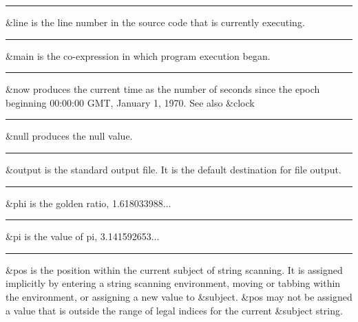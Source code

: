 \bigskip\hrule\vspace{0.1cm}

\noindent
{}\textsf{\&line} is the line number in the
source code that is currently executing.

\bigskip\hrule\vspace{0.1cm}

\noindent
{}\textsf{\&main} is the co-expression in which program
execution began.

\bigskip\hrule\vspace{0.1cm}

\noindent
\textsf{\&}\textsf{now} produces the current time as the
number of seconds since the epoch beginning 00:00:00 GMT, January 1,
1970. See also \&clock

\bigskip\hrule\vspace{0.1cm}

\noindent
{}\textsf{\&null} produces the null value.

\bigskip\hrule\vspace{0.1cm}

\noindent
{}\textsf{\&output} is the standard
output file. It is the default destination for file output.

\bigskip\hrule\vspace{0.1cm}

\noindent
{}\textsf{\&phi}
is the golden ratio, 1.618033988...

\bigskip\hrule\vspace{0.1cm}

\noindent
{}\textsf{\&pi} is the value of pi, 3.141592653...

\bigskip\hrule\vspace{0.1cm}

\noindent
{}\textsf{\&pos} is the position within the
current subject of string scanning. It is assigned implicitly by
entering a string scanning environment, moving or tabbing within the
environment, or assigning a new value to \textsf{\&subject}.
\textsf{\&pos} may not be assigned a value that is outside the range of
legal indices for the current \textsf{\&subject} string.

